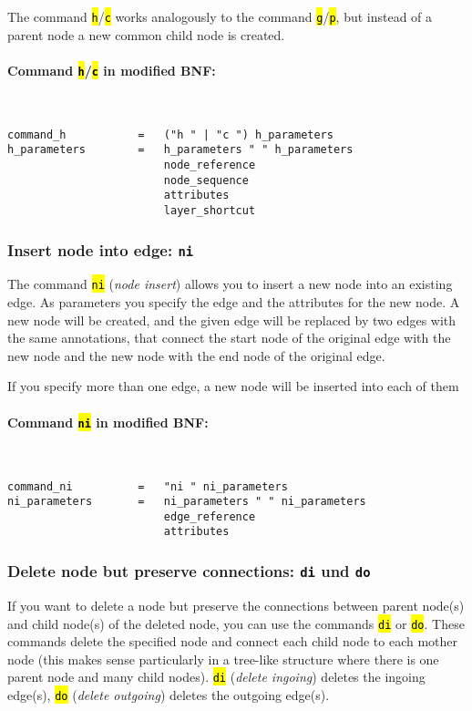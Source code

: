 \documentclass[12pt]{scrartcl}
\newcommand{\code}[1]{\hl{\texttt{#1}}}
\begin{document}
The command \code{h}/\code{c} works analogously to the command \code{g}/\code{p}, but instead of a parent node a new common child node is created.

\paragraph*{Command \code{h}/\code{c} in modified BNF:}
~
\begin{lstlisting}
command_h           =   ("h " | "c ") h_parameters
h_parameters        =   h_parameters " " h_parameters
                        node_reference
                        node_sequence
                        attributes
                        layer_shortcut
\end{lstlisting}


\subsubsection{Insert node into edge: \texttt{ni}}

The command \code{ni} (\textit{node insert}) allows you to insert a new node into an existing edge.
As parameters you specify the edge and the attributes for the new node.
A new node will be created, and the given edge will be replaced by two edges with the same annotations, that connect the start node of the original edge with the new node and the new node with the end node of the original edge.

If you specify more than one edge, a new node will be inserted into each of them

\paragraph*{Command \code{ni} in modified BNF:}
~
\begin{lstlisting}
command_ni          =   "ni " ni_parameters
ni_parameters       =   ni_parameters " " ni_parameters
                        edge_reference
                        attributes
\end{lstlisting}


\subsubsection{Delete node but preserve connections: \texttt{di} und \texttt{do}}

If you want to delete a node but preserve the connections between parent node(s) and child node(s) of the deleted node, you can use the commands \code{di} or \code{do}.
These commands delete the specified node and connect each child node to each mother node (this makes sense particularly in a tree-like structure where there is one parent node and many child nodes).
\code{di} (\textit{delete ingoing}) deletes the ingoing edge(s), \code{do} (\textit{delete outgoing}) deletes the outgoing edge(s).
\end{document}
